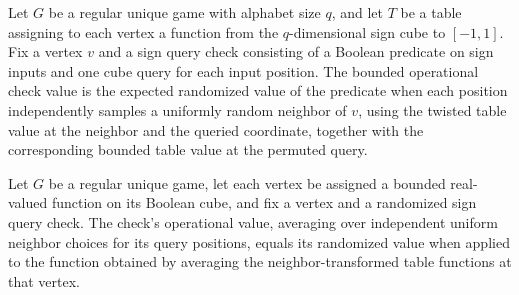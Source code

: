 \begin{definition}
\label{FABL.RegularUniqueGame.boundedOperationalCheckValue}
\leanok
{}
Let $G$ be a regular unique game with alphabet size $q$, and let $T$ be a table
assigning to each vertex a function from the $q$-dimensional sign cube to $[-1,1]$. Fix
a vertex $v$ and a sign query check consisting of a Boolean predicate on sign inputs and
one cube query for each input position. The bounded operational check value is the
expected randomized value of the predicate when each position independently samples a
uniformly random neighbor of $v$, using the twisted table value at the neighbor and the
queried coordinate, together with the corresponding bounded table value at the permuted
query.
\end{definition}

\begin{theorem}
\label{FABL.RegularUniqueGame.boundedOperationalCheckValue_eq_randomizedValue}
\leanok
{}
Let $G$ be a regular unique game, let each vertex be assigned a bounded real-valued
function on its Boolean cube, and fix a vertex and a randomized sign query check. The
check’s operational value, averaging over independent uniform neighbor choices for its
query positions, equals its randomized value when applied to the function obtained by
averaging the neighbor-transformed table functions at that vertex.
\end{theorem}

